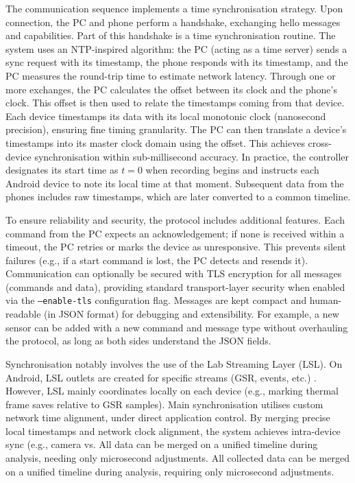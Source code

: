 The communication sequence implements a time synchronisation strategy. Upon connection, the PC and phone perform a handshake, exchanging hello messages and capabilities. Part of this handshake is a time synchronisation routine. The system uses an NTP-inspired algorithm: the PC (acting as a time server) sends a sync request with its timestamp, the phone responds with its timestamp, and the PC measures the round-trip time to estimate network latency. Through one or more exchanges, the PC calculates the offset between its clock and the phone's clock. This offset is then used to relate the timestamps coming from that device. Each device timestamps its data with its local monotonic clock (nanosecond precision), ensuring fine timing granularity. The PC can then translate a device’s timestamps into its master clock domain using the offset. This achieves cross-device synchronisation within sub-millisecond accuracy. In practice, the controller designates its start time as $t = 0$ when recording begins and instructs each Android device to note its local time at that moment. Subsequent data from the phones includes raw timestamps, which are later converted to a common timeline.

To ensure reliability and security, the protocol includes additional features. Each command from the PC expects an acknowledgement; if none is received within a timeout, the PC retries or marks the device as unresponsive. This prevents silent failures (e.g., if a start command is lost, the PC detects and resends it). Communication can optionally be secured with TLS encryption for all messages (commands and data), providing standard transport-layer security when enabled via the \texttt{--enable-tls} configuration flag. Messages are kept compact and human-readable (in JSON format) for debugging and extensibility. For example, a new sensor can be added with a new command and message type without overhauling the protocol, as long as both sides understand the JSON fields.

Synchronisation notably involves the use of the Lab Streaming Layer (LSL). On Android, LSL outlets are created for specific streams (GSR, events, etc.) \cite{ref9}. However, LSL mainly coordinates locally on each device (e.g., marking thermal frame saves relative to GSR samples). Main synchronisation utilises custom network time alignment, under direct application control. By merging precise local timestamps and network clock alignment, the system achieves intra-device sync (e.g., camera vs. All data can be merged on a unified timeline during analysis, needing only microsecond adjustments. All collected data can be merged on a unified timeline during analysis, requiring only microsecond adjustments.

